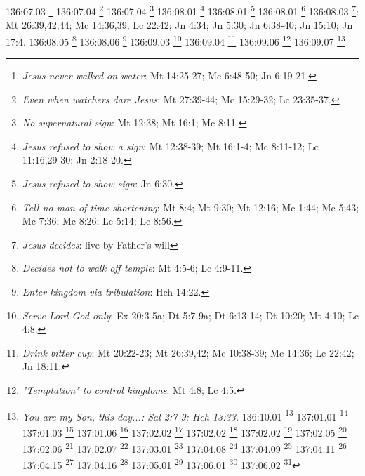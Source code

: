 {{{{{{{{{{{{{{{{{{{{{{{{{{{{{{{{{136:07.03 \footnote{\textit{Jesus never walked on water}: Mt 14:25-27; Mc 6:48-50; Jn 6:19-21.}
136:07.04 \footnote{\textit{Even when watchers dare Jesus}: Mt 27:39-44; Mc 15:29-32; Lc 23:35-37.}
136:07.04 \footnote{\textit{No supernatural sign}: Mt 12:38; Mt 16:1; Mc 8:11.}
136:08.01 \footnote{\textit{Jesus refused to show a sign}: Mt 12:38-39; Mt 16:1-4; Mc 8:11-12; Lc 11:16,29-30; Jn 2:18-20.}
136:08.01 \footnote{\textit{Jesus refused to show sign}: Jn 6:30.}
136:08.01 \footnote{\textit{Tell no man of time-shortening}: Mt 8:4; Mt 9:30; Mt 12:16; Mc 1:44; Mc 5:43; Mc 7:36; Mc 8:26; Lc 5:14; Lc 8:56.}
136:08.03 \footnote{\textit{Jesus decides}: live by Father's will}: Mt 26:39,42,44; Mc 14:36,39; Lc 22:42; Jn 4:34; Jn 5:30; Jn 6:38-40; Jn 15:10; Jn 17:4.}
136:08.05 \footnote{\textit{Decides not to walk off temple}: Mt 4:5-6; Lc 4:9-11.}
136:08.06 \footnote{\textit{Enter kingdom via tribulation}: Hch 14:22.}
136:09.03 \footnote{\textit{Serve Lord God only}: Ex 20:3-5a; Dt 5:7-9a; Dt 6:13-14; Dt 10:20; Mt 4:10; Lc 4:8.}
136:09.04 \footnote{\textit{Drink bitter cup}: Mt 20:22-23; Mt 26:39,42; Mc 10:38-39; Mc 14:36; Lc 22:42; Jn 18:11.}
136:09.06 \footnote{\textit{"Temptation" to control kingdoms}: Mt 4:8; Lc 4:5.}
136:09.07 \footnote{\textit{You are my Son, this day...: Sal 2:7-9; Hch 13:33.}
136:10.01 \footnote{\textit{Pledge to live by will of Father}: Mt 26:39,42,44; Mc 14:36,39; Lc 22:42; Jn 4:34; Jn 5:30; Jn 6:38-40; Jn 15:10; Jn 17:4.}
137:01.01 \footnote{\textit{Andrew selected}: Mt 4:18-20; Mc 1:16-18; Jn 1:40.}
137:01.03 \footnote{\textit{Simon Peter selected}: Mt 4:18-20; Mc 1:16-18; Lc 5:1-9; Jn 1:41-42.}
137:01.06 \footnote{\textit{James & John selected}: Mt 4:21-22; Mc 1:19-20; Lc 5:10-11.}
137:02.02 \footnote{\textit{Daniel quoted}: Dn 7:13.}
137:02.02 \footnote{\textit{Jesus to Galilee}: Mt 4:23; Mc 1:21; Lc 4:14; Jn 1:43.}
137:02.02 \footnote{\textit{John's pronouncement}: Jn 1:35-37.}
137:02.05 \footnote{\textit{Philip selected}: Jn 1:43-44.}
137:02.06 \footnote{\textit{Philip and Nathaniel}: Jn 1:45-46.}
137:02.07 \footnote{\textit{Nathaniel selected}: Jn 1:47-51.}
137:03.01 \footnote{\textit{Wedding in Cana}: Jn 2:1-2.}
137:04.08 \footnote{\textit{Mary's request}: Jn 2:3-4.}
137:04.09 \footnote{\textit{Servants instructed}: Jn 2:5.}
137:04.11 \footnote{\textit{Turning water into wine}: Jn 2:6-8.}
137:04.15 \footnote{\textit{Ruler's comments}: Jn 2:9-10.}
137:04.16 \footnote{\textit{Belief of disciples}: Jn 2:11.}
137:05.01 \footnote{\textit{Group to Capernaum}: Jn 2:12.}
137:06.01 \footnote{\textit{Jesus' mother present}: Jn 2:12.}
137:06.02 \footnote{\textit{(Jesus reads selected verses): Is 66:1-2; Is 66:5-8; Is 66:12-14.}
}}}}}}}}}}}}}}}}}}}}}}}}}}}}}}}}}}
